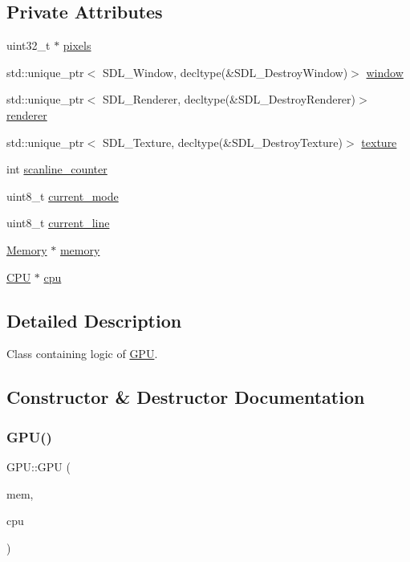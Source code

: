\subsection*{Private Attributes}
\begin{DoxyCompactItemize}
\item 
uint32\+\_\+t $\ast$ \mbox{\hyperlink{classGPU_abf17e918bdde2a603aaaf9e0e1693e89}{pixels}}
\item 
std\+::unique\+\_\+ptr$<$ S\+D\+L\+\_\+\+Window, decltype(\&S\+D\+L\+\_\+\+Destroy\+Window)$>$ \mbox{\hyperlink{classGPU_ab7d41a21fcc7c1e1ab7e5cca3ac810cb}{window}}
\item 
std\+::unique\+\_\+ptr$<$ S\+D\+L\+\_\+\+Renderer, decltype(\&S\+D\+L\+\_\+\+Destroy\+Renderer)$>$ \mbox{\hyperlink{classGPU_a166f896881a453e5160a4b33810492e7}{renderer}}
\item 
std\+::unique\+\_\+ptr$<$ S\+D\+L\+\_\+\+Texture, decltype(\&S\+D\+L\+\_\+\+Destroy\+Texture)$>$ \mbox{\hyperlink{classGPU_a08c8831c262733c78b0bbd82488254f6}{texture}}
\item 
int \mbox{\hyperlink{classGPU_ad54a548926ae8f782f599339939d3454}{scanline\+\_\+counter}}
\item 
uint8\+\_\+t \mbox{\hyperlink{classGPU_a947b1ca9b9a0c9497c3442c35331a476}{current\+\_\+mode}}
\item 
uint8\+\_\+t \mbox{\hyperlink{classGPU_a32558942c706160b5810a5258a7824bb}{current\+\_\+line}}
\item 
\mbox{\hyperlink{classMemory}{Memory}} $\ast$ \mbox{\hyperlink{classGPU_a6ba605ef502ea7adb2bc4335a0817aca}{memory}}
\item 
\mbox{\hyperlink{classCPU}{C\+PU}} $\ast$ \mbox{\hyperlink{classGPU_ac0e1560d40298f3ae2548af7bb44e67d}{cpu}}
\end{DoxyCompactItemize}


\subsection{Detailed Description}
Class containing logic of \mbox{\hyperlink{classGPU}{G\+PU}}. 

\subsection{Constructor \& Destructor Documentation}
\mbox{\label{classGPU_a18e803c48776e14aa5b04d58a35ec4ac}} 
\subsubsection{\texorpdfstring{G\+P\+U()}{GPU()}}
{\footnotesize\ttfamily G\+P\+U\+::\+G\+PU (\begin{DoxyParamCaption}\item[{\mbox{\hyperlink{classMemory}{Memory}} $\ast$}]{mem,  }\item[{\mbox{\hyperlink{classCPU}{C\+PU}} $\ast$}]{cpu }\end{DoxyParamCaption})}



